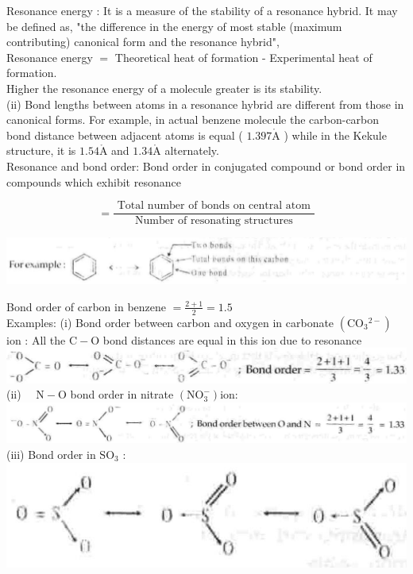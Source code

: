 \documentclass[10pt]{article}
\def\AA{\mathring{\mathrm{A}}}
\begin{document}
Resonance energy : It is a measure of the stability of a resonance hybrid. It may be defined as, "the difference in the energy of most stable (maximum contributing) canonical form and the resonance hybrid",\\
Resonance energy $=$ Theoretical heat of formation - Experimental heat of formation.\\
Higher the resonance energy of a molecule greater is its stability.\\
(ii) Bond lengths between atoms in a resonance hybrid are different from those in canonical forms. For example, in actual benzene molecule the carbon-carbon bond distance between adjacent atoms is equal ( $1.397 \AA$ ) while in the Kekule structure, it is $1.54 \AA$ and $1.34 \AA$ alternately.\\
Resonance and bond order: Bond order in conjugated compound or bond order in compounds which exhibit resonance

$$
=\frac{\text { Total number of bonds on central atom }}{\text { Number of resonating structures }}
$$

\begin{center}
\includegraphics[max width=\textwidth]{2025_01_28_8470952b98110cec3aabg-072(1)}
\end{center}

Bond order of carbon in benzene $=\frac{2+1}{2}=1.5$\\
Examples: (i) Bond order between carbon and oxygen in carbonate $\left(\mathrm{CO}_{3}{ }^{2-}\right)$ ion : All the $\mathrm{C}-\mathrm{O}$ bond distances are equal in this ion due to resonance\\
\includegraphics[max width=\textwidth, center]{2025_01_28_8470952b98110cec3aabg-072(2)}\\
(ii) $\quad \mathrm{N}-\mathrm{O}$ bond order in nitrate $\left(\mathrm{NO}_{3}^{-}\right)$ion:\\
\includegraphics[max width=\textwidth, center]{2025_01_28_8470952b98110cec3aabg-072(3)}\\
(iii) Bond order in $\mathrm{SO}_{3}$ :\\
\includegraphics[max width=\textwidth, center]{2025_01_28_8470952b98110cec3aabg-072}
\end{document}
